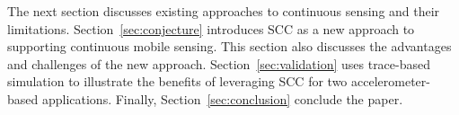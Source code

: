The next section discusses existing approaches to continuous sensing
and their limitations.  Section~\ref{sec:conjecture} introduces SCC as
a new approach to supporting continuous mobile sensing.  This section
also discusses the advantages and challenges of the new approach.
Section~\ref{sec:validation} uses trace-based simulation to illustrate
the benefits of leveraging SCC for two
accelerometer-based applications.  Finally,
Section~\ref{sec:conclusion} conclude the paper.

